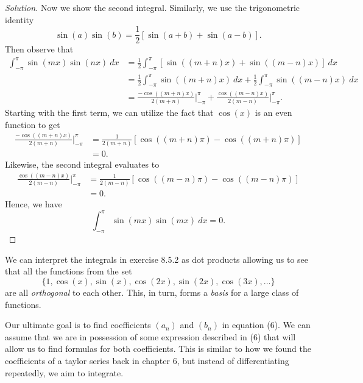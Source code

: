 \begin{enumerate}
\begin{proof}[Solution]
      Now we show the second integral. Similarly, we use the trigonometric identity
      \[ \sin(a)\sin(b) = \frac{ 1 }{ 2 }  [ \sin(a+b) + \sin(a-b) ]. \]
      Then observe that
      \begin{align*}
          \int_{ -\pi  }^{ \pi  } \sin(mx) \sin(nx)  \ dx &= \frac{ 1 }{ 2 } \int_{ - \pi  }^{ \pi  } [ \sin((m+n)x) + \sin((m-n)x)]  \ dx \\
                                                          &= \frac{ 1 }{ 2 } \int_{ - \pi  }^{ \pi  } \sin((m+n)x) \ dx + \frac{ 1 }{ 2 } \int_{ - \pi  }^{ \pi  } \sin((m-n)x) \ dx \\
                                                          &= \frac{ -\cos((m+n)x) }{ 2(m+n) } \Big|_{-\pi}^{\pi} + \frac{ \cos((m-n)x) }{ 2(m-n) } \Big|_{- \pi}^{\pi}.   
      \end{align*}
      Starting with the first term, we can utilize the fact that \( \cos(x) \) is an even function to get
      \begin{align*}
          \frac{ - \cos((m+n)x)  }{ 2(m+n)  } \Big|_{-\pi }^{\pi } &= \frac{ 1 }{ 2(m+n) } [ \cos((m+n) \pi) - \cos((m+n) \pi)] \\
                                                                   &= 0.
      \end{align*}
      Likewise, the second integral evaluates to 
      \begin{align*}
          \frac{ \cos((m-n)x) }{ 2(m-n) } \Big|_{- \pi}^{\pi} &= \frac{ 1 }{ 2(m-n) } [ \cos((m-n)\pi) - \cos((m-n)\pi)] \\
                                                              &= 0.
      \end{align*}
      Hence, we have 
      \[ \int_{ - \pi  }^{ \pi  } \sin(mx) \sin(mx)  \ dx = 0. \]

        \end{proof}
\end{enumerate}

We can interpret the integrals in exercise 8.5.2 as dot products allowing us to see that all the functions from the set 
\[  \{ 1, \cos(x) , \sin(x), \cos(2x), \sin(2x), \cos(3x), \dots \}  \]
are all \textit{orthogonal} to each other. This, in turn, forms a \textit{basis} for a large class of functions.

Our ultimate goal is to find coefficients \( (a_{n}) \) and \( (b_{n}) \) in equation (6). We can assume that we are in possession of some expression described in (6) that will allow us to find formulas for both coefficients. This is similar to how we found the coefficients of a taylor series back in chapter 6, but instead of differentiating repeatedly, we aim to integrate.

